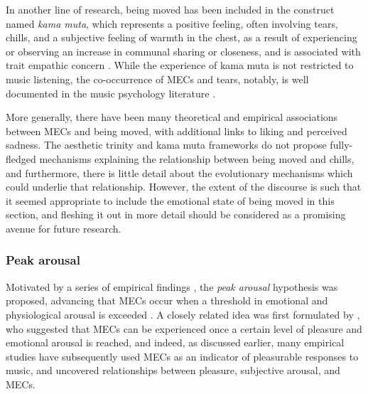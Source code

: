 In another line of research, being moved has been included in the construct named \emph{kama muta}, which represents a positive feeling, often involving tears, chills, and a subjective feeling of warmth in the chest, as a result of experiencing or observing an increase in communal sharing or closeness, and is associated with trait empathic concern \parencite{fiske2019, schubert2018, seibt2018, zickfeld2017, zickfeld2019a, zickfeld2019b}. While the experience of kama muta is not restricted to music listening, the co-occurrence of MECs and tears, notably, is well documented in the music psychology literature \parencite{bannister2019, cotter2018, mori2017, scherer2001, strick2015}.

More generally, there have been many theoretical \parencite[e.g.,][]{menninghaus2015} and empirical \parencite{bannister2018, bannister2019, bannister2020a, benedek2011, eerola2016, panksepp1995, seibt2017, strick2015, vuoskoski2017, wassiliwizky2015, wassiliwizky2017a, wassiliwizky2017b, weth2015} associations between MECs and being moved, with additional links to liking and perceived sadness. The aesthetic trinity and kama muta frameworks do not propose fully-fledged mechanisms explaining the relationship between being moved and chills, and furthermore, there is little detail about the evolutionary mechanisms which could underlie that relationship. However, the extent of the discourse is such that it seemed appropriate to include the emotional state of being moved in this section, and fleshing it out in more detail should be considered as a promising avenue for future research.

\subsubsection{Peak arousal}

Motivated by a series of empirical findings \parencites{grewe2007, grewe2009a, guhn2007, rickard2004}[as cited by][]{benedek2011}, the \emph{peak arousal} hypothesis was proposed, advancing that MECs occur when a threshold in emotional and physiological arousal is exceeded \parencite{benedek2011}. A closely related idea was first formulated by \textcite{blood2001}, who suggested that MECs can be experienced once a certain level of pleasure and emotional arousal is reached, and indeed, as discussed earlier, many empirical studies have subsequently used MECs as an indicator of pleasurable responses to music, and uncovered relationships between pleasure, subjective arousal, and MECs.

